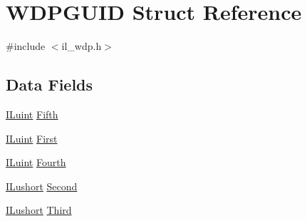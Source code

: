 \hypertarget{struct_w_d_p_g_u_i_d}{\section{W\-D\-P\-G\-U\-I\-D Struct Reference}
\label{struct_w_d_p_g_u_i_d}
}


{\ttfamily \#include $<$il\-\_\-wdp.\-h$>$}

\subsection*{Data Fields}
\begin{DoxyCompactItemize}
\item 
\hyperlink{il_8h_ac6508d0e9c19e32f32e00d54b5b8cf30}{I\-Luint} \hyperlink{struct_w_d_p_g_u_i_d_af5a34e251fc670ba653e8df9b0b62583}{Fifth}
\item 
\hyperlink{il_8h_ac6508d0e9c19e32f32e00d54b5b8cf30}{I\-Luint} \hyperlink{struct_w_d_p_g_u_i_d_abaf6ad56108ad00e5270bca08b905d7f}{First}
\item 
\hyperlink{il_8h_ac6508d0e9c19e32f32e00d54b5b8cf30}{I\-Luint} \hyperlink{struct_w_d_p_g_u_i_d_a51cc81b0d4570c61909ecf61a9c3fbf2}{Fourth}
\item 
\hyperlink{il_8h_af6287b43748354a7c4864da43ae56962}{I\-Lushort} \hyperlink{struct_w_d_p_g_u_i_d_a57dd70b59f7720c5ff7f8a9d36621cd3}{Second}
\item 
\hyperlink{il_8h_af6287b43748354a7c4864da43ae56962}{I\-Lushort} \hyperlink{struct_w_d_p_g_u_i_d_a58c69b1ba24198c7f0ce762b31736d8d}{Third}
\end{DoxyCompactItemize}


